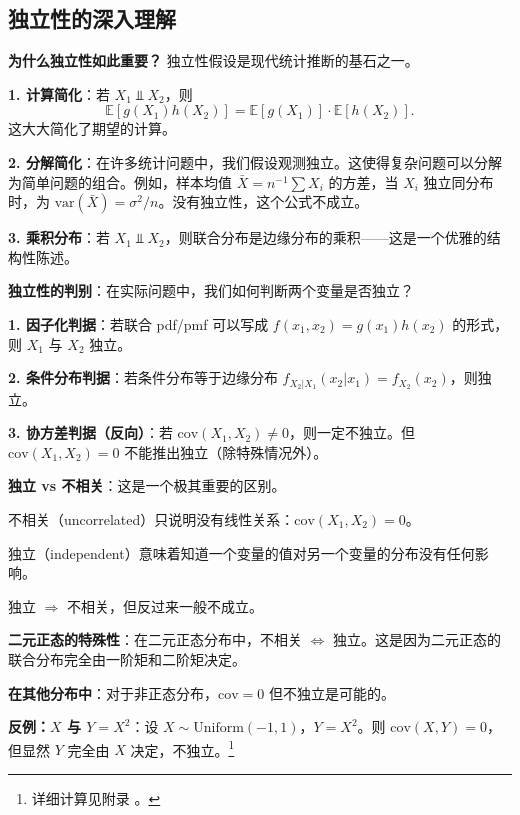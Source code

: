 
\subsection{独立性的深入理解}

\textbf{为什么独立性如此重要？} 独立性假设是现代统计推断的基石之一。

\textbf{1. 计算简化}：若 $X_1 \Perp X_2$，则
\[
\mathbb{E}[g(X_1)h(X_2)] = \mathbb{E}[g(X_1)] \cdot \mathbb{E}[h(X_2)].
\]
这大大简化了期望的计算。

\textbf{2. 分解简化}：在许多统计问题中，我们假设观测独立。这使得复杂问题可以分解为简单问题的组合。例如，样本均值 $\bar{X} = n^{-1}\sum X_i$ 的方差，当 $X_i$ 独立同分布时，为 $\text{var}(\bar{X}) = \sigma^2/n$。没有独立性，这个公式不成立。

\textbf{3. 乘积分布}：若 $X_1 \Perp X_2$，则联合分布是边缘分布的乘积——这是一个优雅的结构性陈述。

\textbf{独立性的判别}：在实际问题中，我们如何判断两个变量是否独立？

\textbf{1. 因子化判据}：若联合 pdf/pmf 可以写成 $f(x_1, x_2) = g(x_1)h(x_2)$ 的形式，则 $X_1$ 与 $X_2$ 独立。

\textbf{2. 条件分布判据}：若条件分布等于边缘分布 $f_{X_2|X_1}(x_2|x_1) = f_{X_2}(x_2)$，则独立。

\textbf{3. 协方差判据（反向）}：若 $\text{cov}(X_1, X_2) \neq 0$，则一定不独立。但 $\text{cov}(X_1, X_2) = 0$ 不能推出独立（除特殊情况外）。

\textbf{独立 vs 不相关}：这是一个极其重要的区别。

不相关（uncorrelated）只说明没有线性关系：$\text{cov}(X_1, X_2) = 0$。

独立（independent）意味着知道一个变量的值对另一个变量的分布没有任何影响。

独立 $\Rightarrow$ 不相关，但反过来一般不成立。

\textbf{二元正态的特殊性}：在二元正态分布中，不相关 $\iff$ 独立。这是因为二元正态的联合分布完全由一阶矩和二阶矩决定。

\textbf{在其他分布中}：对于非正态分布，$\text{cov} = 0$ 但不独立是可能的。

\textbf{反例：$X$ 与 $Y = X^2$}：设 $X \sim \text{Uniform}(-1, 1)$，$Y = X^2$。则 $\text{cov}(X, Y) = 0$，但显然 $Y$ 完全由 $X$ 决定，不独立。\footnote{详细计算见附录 。}

